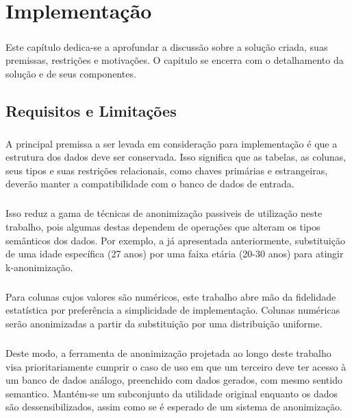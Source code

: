 \chapter{Implementação}
\label{cap4}

\paragraph{} Este capítulo dedica-se a aprofundar a discussão sobre a solução criada, suas premissas, restrições e motivações. O capitulo se encerra com o detalhamento da solução e de seus componentes.

\section{Requisitos e Limitações}

\paragraph{} A principal premissa a ser levada em consideração para implementação é que a estrutura dos dados deve ser conservada. Isso significa que as tabelas, as colunas, seus tipos e suas restrições relacionais, como chaves primárias e estrangeiras, deverão manter a compatibilidade com o banco de dados de entrada.

\paragraph{} Isso reduz a gama de técnicas de anonimização passiveis de utilização neste trabalho, pois algumas destas dependem de operações que alteram os tipos semânticos dos dados. Por exemplo, a já apresentada anteriormente, substituição de uma idade específica (27 anos) por uma faixa etária (20-30 anos) para atingir k-anonimização.

\paragraph{} Para colunas cujos valores são numéricos, este trabalho abre mão da fidelidade estatística por preferência a simplicidade de implementação. Colunas numéricas serão anonimizadas a partir da substituição por uma distribuição uniforme.

\paragraph{} Deste modo, a ferramenta de anonimização projetada ao longo deste trabalho visa prioritariamente cumprir o caso de uso em que um terceiro deve ter acesso à um banco de dados análogo, preenchido com dados gerados, com mesmo sentido semantico. Mantém-se um subconjunto da utilidade original enquanto os dados são dessensibilizados, assim como se é esperado de um sistema de anonimização.

